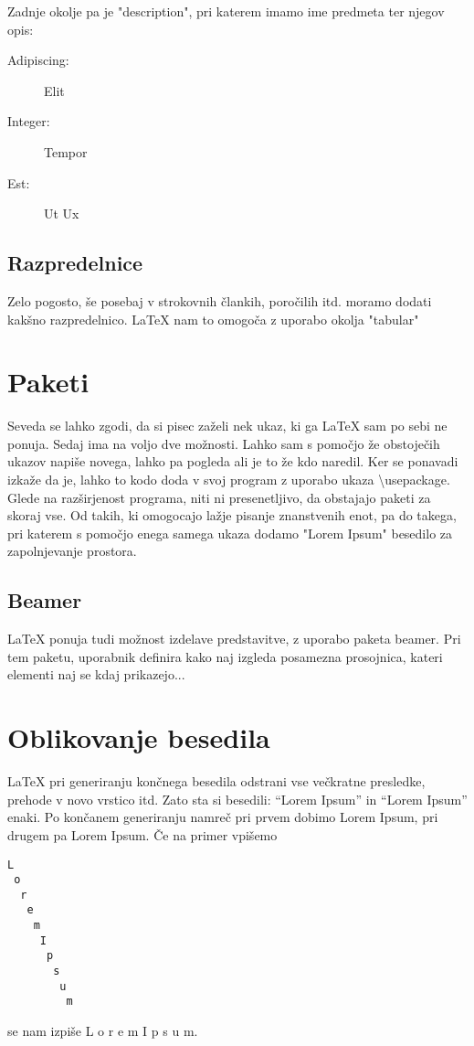 \documentclass[a4paper]{book}
\newcommand\tbs{\textbackslash{}}
\begin{document}
Zadnje okolje pa je "description", pri katerem imamo ime predmeta ter njegov opis:
\begin{description}
\item[Adipiscing:] Elit
\item[Integer:] Tempor
\item[Est:] Ut Ux
\end{description}

\subsection{Razpredelnice}

Zelo pogosto, še posebaj v strokovnih člankih, poročilih itd. moramo dodati kakšno razpredelnico. \LaTeX{} nam to omogoča z uporabo okolja "tabular"


\section{Paketi}
Seveda se lahko zgodi, da si pisec zaželi nek ukaz, ki ga \LaTeX{} sam po sebi ne ponuja. Sedaj ima na voljo dve možnosti. Lahko sam s pomočjo že obstoječih ukazov napiše novega, lahko pa pogleda ali je to že kdo naredil. Ker se ponavadi izkaže da je, lahko to kodo doda v svoj program z uporabo ukaza \tbs{}usepackage. Glede na razširjenost programa, niti ni presenetljivo, da obstajajo paketi za skoraj vse. Od takih, ki omogocajo lažje pisanje znanstvenih enot, pa do takega, pri katerem s pomočjo enega samega ukaza dodamo "Lorem Ipsum" besedilo za zapolnjevanje prostora.

\subsection{Beamer}
\LaTeX{} ponuja tudi možnost izdelave predstavitve, z uporabo paketa beamer. Pri tem paketu, uporabnik definira kako naj izgleda posamezna prosojnica, kateri elementi naj se kdaj prikazejo...


\section{Oblikovanje besedila}


\LaTeX{} pri generiranju končnega besedila odstrani vse večkratne presledke, prehode v novo vrstico itd. Zato sta si besedili: ``Lorem{ }{ }{ }{ }{ }{ }{ }{ }{ }{ }{ }{ }{ }{ }{ }{ }Ipsum'' in ``Lorem Ipsum'' enaki. Po končanem generiranju namreč pri prvem dobimo Lorem               Ipsum, pri drugem pa Lorem Ipsum. Če na primer vpišemo
\begin{verbatim}
L
 o
  r
   e
    m
     I
      p
       s
        u
         m
\end{verbatim}
se nam izpiše 
L
 o
  r
   e
    m
     I
      p
       s
        u
         m.
\end{document}
